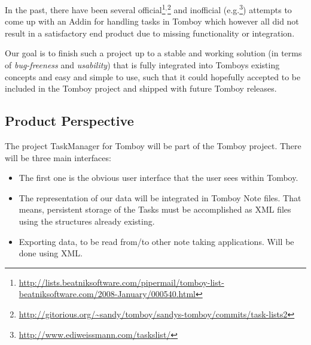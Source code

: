 
\label{integration}
In the past, there have been several official\footnote{\url{http://lists.beatniksoftware.com/pipermail/tomboy-list-beatniksoftware.com/2008-January/000540.html}}$^,$\footnote{\url{http://gitorious.org/~sandy/tomboy/sandys-tomboy/commits/task-lists2}} and inofficial (e.g.\footnote{\url{http://www.ediweissmann.com/taskslist/}}) attempts to come up with an Addin for handling tasks in Tomboy which however all did not result in a satisfactory end product due to missing functionality or integration.

Our goal is to finish such a project up to a stable and working solution (in terms of \textit{bug-freeness} and \textit{usability}) that is fully integrated into Tomboys existing concepts and easy and simple to use, such that it could hopefully accepted to be included in the Tomboy project and shipped with future Tomboy releases.

\subsection{Product Perspective}
\label{description:perspective}
  The project TaskManager for Tomboy will be part of the Tomboy project. There will be three main interfaces:

  \begin{itemize}
    \item The first one is the obvious user interface that the user sees within Tomboy.
    \item The representation of our data will be integrated in Tomboy Note files. That means, persistent storage of the Tasks must be accomplished as XML files using the structures already existing.
    \item Exporting data, to be read from/to other note taking applications. Will be done using XML.
  \end{itemize}

